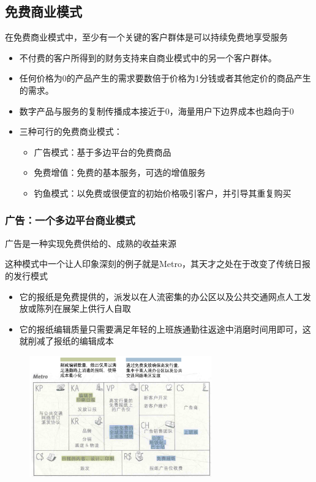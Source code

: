     \subsection{免费商业模式}
    在免费商业模式中，至少有一个关键的客户群体是可以持续免费地享受服务
    \begin{itemize}
        \item 不付费的客户所得到的财务支持来自商业模式中的另一个客户群体。
        \item 任何价格为0的产品产生的需求要数倍于价格为1分钱或者其他定价的商品产生的需求。
        \item 数字产品与服务的复制传播成本接近于0，海量用户下边界成本也趋向于0
        \item 三种可行的免费商业模式：
        \begin{itemize}
            \item 广告模式：基于多边平台的免费商品
            \item 免费增值：免费的基本服务，可选的增值服务
            \item 钓鱼模式：以免费或很便宜的初始价格吸引客户，并引导其重复购买
        \end{itemize}
    \end{itemize}

    \subsubsection{广告：一个多边平台商业模式}
    广告是一种实现免费供给的、成熟的收益来源

    这种模式中一个让人印象深刻的例子就是Metro，其天才之处在于改变了传统日报的发行模式
    \begin{itemize}
        \item 它的报纸是免费提供的，派发以在人流密集的办公区以及公共交通网点人工发放或陈列在展架上供行人自取
        \item 它的报纸编辑质量只需要满足年轻的上班族通勤往返途中消磨时间用即可，这就削减了报纸的编辑成本 
    \end{itemize}

    \begin{figure}[H]
		\centering
        \vspace{-0.5em}
		\includegraphics[width=0.7\textwidth]{img/Metro的商业模式.png}
        \vspace{-0.5em}
	\end{figure}

